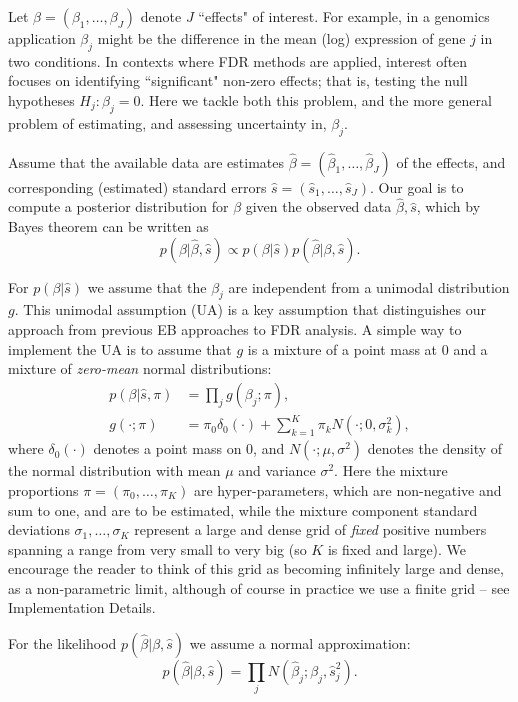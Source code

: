 \documentclass[11pt]{article}
\def\bhat{\hat{\beta}}
\def\shat{\hat{s}}
\begin{document}
Let $\beta=(\beta_1,\dots,\beta_J)$ denote $J$ ``effects" of interest. For example, in a genomics application 
$\beta_j$ might be the difference in the mean (log) expression of gene $j$ in two conditions.
In contexts where FDR methods are applied, interest often focuses on identifying ``significant" non-zero effects;
that is, testing the null hypotheses $H_j:\beta_j=0$.  Here we tackle both this problem, and the  
more general problem of estimating, and assessing uncertainty in, $\beta_j$.
 
Assume that the available data are estimates $\bhat=(\bhat_1,\dots,\bhat_J)$ of the effects,
and corresponding (estimated) standard errors $\shat=(\shat_1,\dots,\shat_J)$.  Our goal is to compute a posterior distribution for $\beta$ given the observed data $\bhat,\shat$,
which by Bayes theorem can be written as 
\begin{equation}
p(\beta | \bhat, \shat) \propto p(\beta | \shat) p(\bhat | \beta, \shat).
\end{equation}

For $p(\beta | \shat)$ we assume that the $\beta_j$ are independent from a unimodal distribution $g$.
This unimodal assumption (UA) is a key assumption that distinguishes our approach from previous EB approaches to FDR analysis.
A simple way to implement the UA is to assume that $g$ is
a mixture of a point mass at 0 and a mixture of {\it zero-mean} normal distributions:
\begin{align} \label{eqn:beta}
p(\beta | \shat, \pi) & = \prod_j g(\beta_j; \pi), \\   
g(\cdot; \pi) & = \pi_0 \delta_0(\cdot) + \sum_{k=1}^K \pi_k N(\cdot; 0, \sigma_k^2), \label{eqn:mixnorm}
\end{align}
where $\delta_0(\cdot)$ denotes a point mass on 0, and $N(\cdot; \mu, \sigma^2)$ denotes the density of the normal distribution with mean $\mu$ and variance $\sigma^2$.
Here the mixture proportions $\pi=(\pi_0,\dots,\pi_K)$ are hyper-parameters, which are non-negative and sum to one, and are to be estimated,
while the mixture component standard deviations $\sigma_1,\dots,\sigma_K$ 
represent a large and dense grid of {\it fixed} positive numbers spanning a range from very small to very big (so $K$ is fixed and large). 
We encourage the reader to think of this grid as becoming infinitely large and dense, as a non-parametric limit,
although of course in practice we use a finite grid -- see Implementation Details.

For the likelihood $p(\bhat | \beta, \shat)$ we assume a normal approximation:
\begin{equation} \label{eqn:normlik}
p(\bhat | \beta, \shat) = \prod_j N(\bhat_j; \beta_j, \shat_j^2).
\end{equation}
\end{document}
